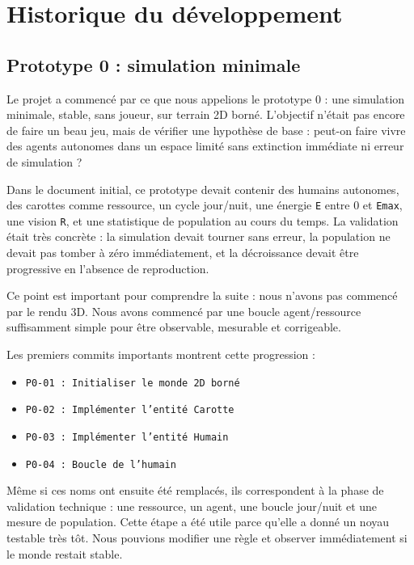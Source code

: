 ﻿\documentclass[11pt,a4paper]{article}
\begin{document}
\section{Historique du développement}

\subsection{Prototype 0 : simulation minimale}

Le projet a commencé par ce que nous appelions le prototype 0 : une simulation minimale, stable, sans joueur, sur terrain 2D borné. L'objectif n'était pas encore de faire un beau jeu, mais de vérifier une hypothèse de base : peut-on faire vivre des agents autonomes dans un espace limité sans extinction immédiate ni erreur de simulation ?

Dans le document initial, ce prototype devait contenir des humains autonomes, des carottes comme ressource, un cycle jour/nuit, une énergie \texttt{E} entre 0 et \texttt{Emax}, une vision \texttt{R}, et une statistique de population au cours du temps. La validation était très concrète : la simulation devait tourner sans erreur, la population ne devait pas tomber à zéro immédiatement, et la décroissance devait être progressive en l'absence de reproduction.

Ce point est important pour comprendre la suite : nous n'avons pas commencé par le rendu 3D. Nous avons commencé par une boucle agent/ressource suffisamment simple pour être observable, mesurable et corrigeable.

Les premiers commits importants montrent cette progression :

\begin{itemize}[noitemsep]
  \item \texttt{P0-01 : Initialiser le monde 2D borné}
  \item \texttt{P0-02 : Implémenter l'entité Carotte}
  \item \texttt{P0-03 : Implémenter l'entité Humain}
  \item \texttt{P0-04 : Boucle de l'humain}
\end{itemize}

Même si ces noms ont ensuite été remplacés, ils correspondent à la phase de validation technique : une ressource, un agent, une boucle jour/nuit et une mesure de population. Cette étape a été utile parce qu'elle a donné un noyau testable très tôt. Nous pouvions modifier une règle et observer immédiatement si le monde restait stable.
\end{document}
